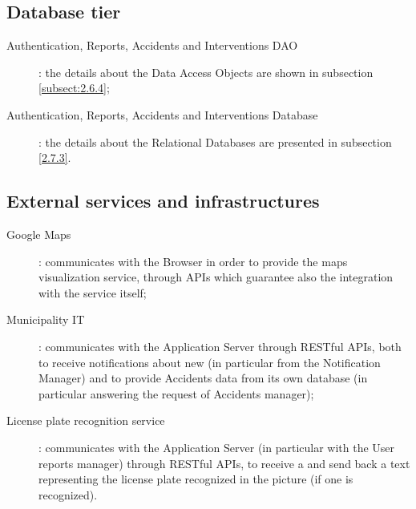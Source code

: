 \documentclass[../../DD.tex]{subfiles}
\begin{document}
\subsection{Database tier\label{sect:2.2.4}}
	\begin{description}
	\item[Authentication, Reports, Accidents and Interventions DAO]: the details about the Data Access Objects are shown in subsection \ref{subsect:2.6.4};
	\item[Authentication, Reports, Accidents and Interventions Database]: the details about the Relational Databases are presented in subsection \ref{2.7.3}.
	\end{description}
	
\subsection{External services and infrastructures\label{sect:2.2.5}}
	\begin{description}
	\item[Google Maps]: communicates with the Browser in order to provide the maps visualization service, through APIs which guarantee also the integration with the service itself;
	
	\item[Municipality IT]: communicates with the Application Server through RESTful APIs, both to receive notifications about new  (in particular from the Notification Manager) and to provide Accidents data from its own database (in particular answering the request of Accidents manager);
	
	\item[License plate recognition service]: communicates with the Application Server (in particular with the User reports manager) through RESTful APIs, to receive a  and send back a text representing the license plate recognized in the picture (if one is recognized). 
	\end{description}

\newpage
\end{document}

